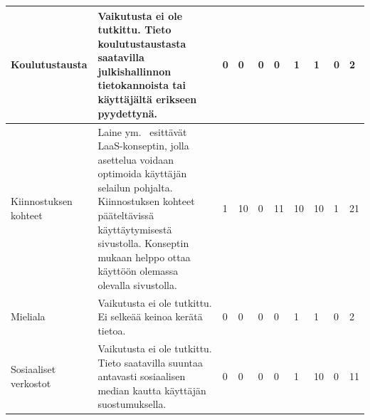 \documentclass[finnish, 12pt, a4paper, elec, utf8, a-1b, online]{aaltothesis}
\begin{document}
{\begin{longtable}{p{2.5cm}|p{6cm}|p{0.5cm}p{0.5cm}p{0.5cm}|p{0.5cm}|p{0.5cm}p{0.5cm}p{0.5cm}|p{0.5cm}|}
    \midrule
    Koulutustausta                          & Vaikutusta ei ole tutkittu. Tieto koulutustaustasta saatavilla julkishallinnon tietokannoista tai käyttäjältä erikseen pyydettynä.                                                                                                                                                                                                                                      & 0                                          & 0                                   & 0                                      & 0                            & 1                                               & 1                                         & 0                                         & 2                            \\
    \midrule
    Kiinnostuksen kohteet                   & Laine ym.~\cite{laine2020_laas} esittävät LaaS-konseptin, jolla asettelua voidaan optimoida käyttäjän selailun pohjalta. Kiinnostuksen kohteet pääteltävissä käyttäytymisestä sivustolla. Konseptin mukaan helppo ottaa käyttöön olemassa olevalla sivustolla.                                                                                                           & 1                                          & 10                                  & 0                                      & 11                           & 10                                              & 10                                        & 1                                         & 21                           \\
    \midrule
    Mieliala                                & Vaikutusta ei ole tutkittu. Ei selkeää keinoa kerätä tietoa.                                                                                                                                                                                                                                                                                                            & 0                                          & 0                                   & 0                                      & 0                            & 1                                               & 1                                         & 0                                         & 2                            \\
    \midrule
    Sosiaaliset verkostot                   & Vaikutusta ei ole tutkittu. Tieto saatavilla suuntaa antavasti sosiaalisen median kautta käyttäjän suostumuksella.                                                                                                                                                                                                                                                      & 0                                          & 0                                   & 0                                      & 0                            & 1                                               & 10                                        & 0                                         & 11                           \\

\end{longtable}}
\end{document}
